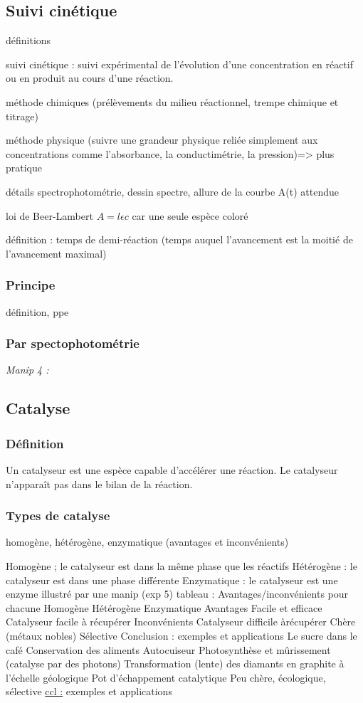 \documentclass{article}%
\begin{document}
\subsection{Suivi cinétique}

définitions

suivi cinétique : suivi expérimental de l’évolution d’une concentration en réactif ou en produit
au cours d’une réaction.

méthode chimiques (prélèvements du milieu réactionnel, trempe chimique et titrage)

méthode physique (suivre une grandeur physique reliée simplement aux concentrations comme
l’absorbance, la conductimétrie, la pression)=> plus pratique

détails spectrophotométrie, dessin spectre, allure de la courbe A(t) attendue

loi de Beer-Lambert $A=l \epsilon c$ car une seule espèce coloré

définition : temps de demi-réaction (temps auquel l’avancement est la moitié de l’avancement
maximal)

\subsubsection{Principe}
définition, ppe


\subsubsection{Par spectophotométrie}
\textit{Manip 4 :}
\subsection{Catalyse}
\subsubsection{Définition}
Un catalyseur est une espèce capable d’accélérer une réaction. Le catalyseur n’apparaît pas dans
le bilan de la réaction.
\subsubsection{Types de catalyse}
homogène, hétérogène, enzymatique (avantages et inconvénients)

Homogène ; le catalyseur est dans la même phase que les réactifs
Hétérogène : le catalyseur est dans une phase différente
Enzymatique : le catalyseur est une enzyme
illustré par une manip (exp 5)
tableau : Avantages/inconvénients pour chacune
Homogène
Hétérogène
Enzymatique
Avantages Facile et efficace Catalyseur facile à
récupérer
Inconvénients Catalyseur difficile àrécupérer Chère (métaux nobles) Sélective
Conclusion : exemples et applications
Le sucre dans le café
Conservation des aliments
Autocuiseur
Photosynthèse et mûrissement (catalyse par des photons)
Transformation (lente) des diamants en graphite à l’échelle géologique
Pot d’échappement catalytique
Peu chère, écologique,
sélective
\underline{ccl :} exemples et applications
\end{document}
